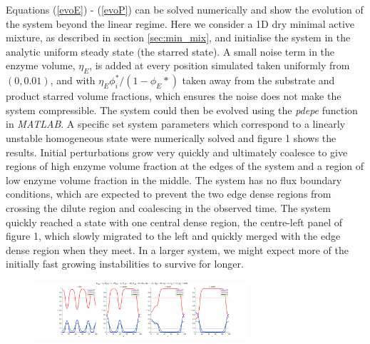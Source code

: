 Equations (\ref{evoE}) - (\ref{evoP}) can be solved numerically and show the evolution of the system beyond the linear regime. Here we consider a 1D dry minimal active mixture, as described in section \ref{sec:min_mix}, and initialise the system in the analytic uniform steady state (the starred state). A small noise term in the enzyme volume, $\eta_E$, is added at every position simulated taken uniformly from $(0, 0.01)$, and with $\eta_E\phi_i^*/(1-\phi_E*)$ taken away from the substrate and product starred volume fractions, which ensures the noise does not make the system compressible. The system could then be evolved using the \textit{pdepe} function in \textit{MATLAB}\cite{lawrence_shampine_pdepe_2013}. A specific set system parameters which correspond to a linearly unstable homogeneous state were numerically solved and  figure 1 shows the results. Initial perturbations grow very quickly and ultimately coalesce to give regions of high enzyme volume fraction at the edges of the system and a region of low enzyme volume fraction in the middle. The system has no flux boundary conditions, which are expected to prevent the two edge dense regions from crossing the dilute region and coalescing in the observed time. The system quickly reached a state with one central dense region, the centre-left panel of figure 1, which slowly migrated to the left and quickly merged with the edge dense region when they meet. In a larger system, we might expect more of the initially fast growing instabilities to survive for longer.
\begin{figure}[b]
\includegraphics[width=8cm]{figures/high_enz.svg}
\end{figure}
\begin{figure}[b]
  \makebox[\textwidth][c]{}
\end{figure}

